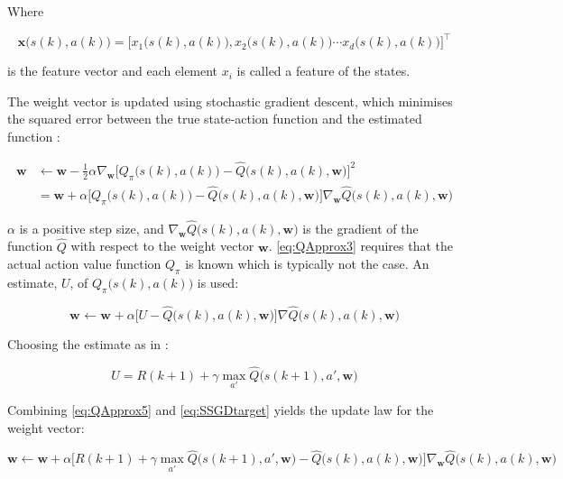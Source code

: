 Where 

\begin{equation}
	\textbf{x}\bigg(s(k),a(k)\bigg) = \bigg[x_{1}\bigg(s(k),a(k)\bigg), x_{2}\bigg(s(k),a(k)\bigg) \cdots x_{d}\bigg(s(k),a(k)\bigg)\bigg]^\intercal
\end{equation}
 
is the feature vector and each element $ x_{i} $ is called a feature of the states.

The weight vector is updated using stochastic gradient descent, which minimises the squared error between the true state-action function and the estimated function \cite{Overgaard2019}:

\begin{equation}\label{eq:QApprox3}
	\begin{split}
		\textbf{w} 
		& \leftarrow\textbf{w}-\frac{1}{2}\alpha\nabla_{\textbf{w}}\big[Q_{\pi}\bigg(s(k),a(k)\bigg)-\hat{Q}\bigg(s(k),a(k),\textbf{w}\bigg)\bigg]^{2}\\
		&=\textbf{w}+\alpha\bigg[Q_{\pi}\bigg(s(k),a(k)\bigg)-\hat{Q}\bigg(s(k),a(k),\textbf{w}\bigg)\bigg]\nabla_{\textbf{w}}\hat{Q}\bigg(s(k),a(k),\textbf{w}\bigg)
	\end{split}
\end{equation}


$\alpha$ is a positive step size, and $\nabla_{\textbf{w}} \hat{Q}\bigg(s(k),a(k),\textbf{w}\bigg)$ is the gradient of the function $ \hat{Q} $ with respect to the weight vector $ \textbf{w} $. \cref{eq:QApprox3} requires that the actual action value function $ Q_{\pi} $ is known which is typically not the case. An estimate, $ U $, of $ Q_{\pi}\bigg(s(k),a(k)\bigg) $ is used:

\begin{equation}\label{eq:QApprox5}
	\textbf{w}_{} \leftarrow \textbf{w}_{}+\alpha\bigg[U-\hat{Q}\bigg(s(k),a(k),\textbf{w}\bigg)\bigg]\nabla\hat{Q}\bigg(s(k),a(k),\textbf{w}\bigg)
\end{equation}

Choosing the estimate as in \cite{Overgaard2019,Sutton2020}: 

\begin{equation}\label{eq:SSGDtarget}
	U = R(k+1)+\gamma \max_{a'}\hat{Q}\bigg(s(k+1),a',\textbf{w}\bigg)
\end{equation}

Combining \cref{eq:QApprox5} and \cref{eq:SSGDtarget} yields the update law for the weight vector:

\begin{equation}\label{eq:QApprox6}
	\textbf{w} \leftarrow \textbf{w}
	+\alpha\bigg[R(k+1)+\gamma\max_{a'}\hat{Q}\bigg(s(k+1),a',\textbf{w}\bigg)
	-\hat{Q}\bigg(s(k),a(k),\textbf{w}\bigg)\bigg]\nabla_{\textbf{w}}\hat{Q}\bigg(s(k),a(k),\textbf{w}\bigg)
\end{equation}

